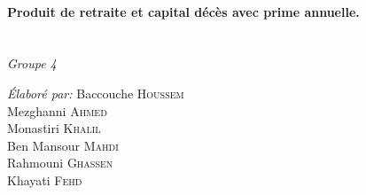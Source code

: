 \documentclass[french]{report}
\begin{document}
\begin{titlepage}
\HRule \\[0.6cm]
{ \huge \bfseries  Produit de retraite et capital décès avec prime annuelle.}\\[0.4cm] %
\HRule \\[1cm]
 










%
%
%
%





\\
\newline
\emph{Groupe 4} {\large } \\[0.9cm]
  
\begin{minipage}{0.4\textwidth}
\begin{flushleft} \large
\emph{Élaboré par:}
\newline
Baccouche \textsc{Houssem} \\ 
Mezghanni \textsc{Ahmed} \\
Monastiri \textsc{Khalil} \\
Ben Mansour \textsc{Mahdi} \\
Rahmouni  \textsc{Ghassen} \\
Khayati  \textsc{Fehd} \\


\end{flushleft}
\end{minipage}
\end{titlepage}
\end{document}
